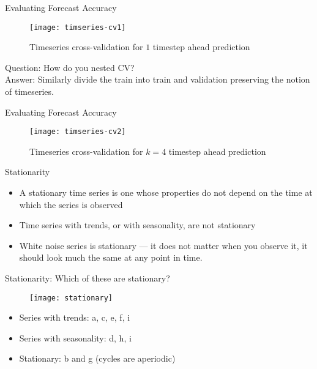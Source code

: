 \documentclass{beamer}
\begin{document}
\begin{frame}{Evaluating Forecast Accuracy}
\begin{figure}
	\centering
	\texttt{[image: timseries-cv1]}
	\caption{Timeseries cross-validation for $1$ timestep ahead prediction}
	\vspace{-15pt}
	\label{fig:timeseries-cv}
\end{figure}
Question: How do you nested CV? \\
Answer: Similarly divide the train into train and validation preserving the notion of timeseries.
\end{frame}

\begin{frame}{Evaluating Forecast Accuracy}
\begin{figure}
	\centering
	\texttt{[image: timseries-cv2]}
	\caption{Timeseries cross-validation for $k=4$ timestep ahead prediction}
	\vspace{-15pt}
	\label{fig:timeseries-cv}
\end{figure}

\end{frame}

\begin{frame}{Stationarity}
\begin{itemize}
\item A stationary time series is one whose properties do not depend on the time at which the series is observed
	\item Time series with trends, or with seasonality, are not stationary 
	\pause
\item White noise series is stationary — it does not matter when you observe it, it should look much the same at any point in time.
\end{itemize}
\end{frame}

\begin{frame}{Stationarity: Which of these are stationary?}
\begin{figure}
	\centering
	\texttt{[image: stationary]}
	\vspace{-15pt}
	\label{fig:timeseries-cv}
\end{figure}
\begin{itemize}
\item Series with trends: a, c, e, f, i
	\item Series with seasonality: d, h, i
	\pause
\item Stationary: b and g (cycles are aperiodic)
\end{itemize}
\end{frame}
\end{document}
